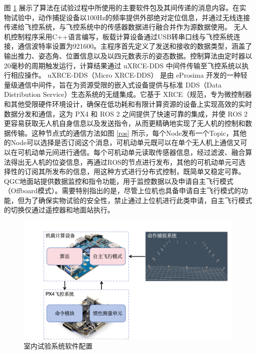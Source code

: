 \documentclass[lang=chs, degree=master, blindreview=false, winfonts=true]{yanputhesis}
\begin{document}
图 \ref{framewor} 展示了算法在试验过程中所使用的主要软件包及其间传递的消息内容。在实物试验中，动作捕捉设备以100Hz的频率提供外部绝对定位信息，并通过无线连接传递给飞控系统，与飞控系统中的传感器数据进行融合并作为源数据使用。
无人机控制程序采用C++语言编写，板载计算设备通过USB转串口线与飞控系统连接，通信波特率设置为921600。主程序首先定义了发送和接收的数据类型，涵盖了输出推力、姿态角、位置信息以及以四元数表示的姿态数据。控制算法由定时器以20毫秒的周期触发运行，计算结果通过 uXRCE-DDS 中间件传输至飞控系统以执行相应操作。
uXRCE-DDS（Micro XRCE-DDS） 是由 eProsima 开发的一种轻量级通信中间件，旨在为资源受限的嵌入式设备提供与标准 DDS（Data Distribution Service）生态系统的无缝集成。它基于 XRCE（规范，专为微控制器和其他受限硬件环境设计，确保在低功耗和有限计算资源的设备上实现高效的实时数据分发和通信，这为 PX4 和 ROS 2 之间提供了快速可靠的集成，并使 ROS 2 更容易获取无人机自身信息以及发送指令，从而更精确地实现了无人机的控制和数据传输。这种节点式的通信方法如图 \ref{ros} 所示，每个Node发布一个Topic，其他的Node可以选择是否订阅这个消息，可机动单元既可以在单个无人机上通信又可以在可机动单元间进行通信。每个可机动单元读取传感器信息，经过滤波、融合算法得出无人机的位姿信息，再通过ROS的节点进行发布，其他的可机动单元可选择性的订阅其所发布的信息，用这种方式进行分布式控制，既简单又稳定可靠。
QGC地面站提供数据监控和指令功能，用于监控数据以及申请自主飞行模式（Offboard模式）。需要特别指出的是，尽管上位机也具备申请自主飞行模式的功能，但为了确保实物试验的安全性，禁止通过上位机进行此类申请，自主飞行模式的切换仅通过遥控器和地面站执行。
\begin{figure}[hbt!]
	\centering
	\hspace{-1.1cm}
	\includegraphics[width=38pc]{picture/5_9.png} 
	\caption{室内试验系统软件配置} 
	\label{framewor}
\end{figure}
\end{document}
